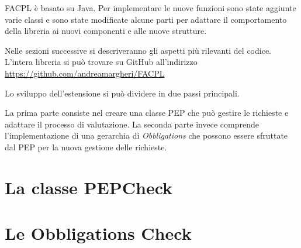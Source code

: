 \label{chap:Estensione della libreria FACPL}
FACPL è basato su Java. Per implementare le nuove funzioni sono state aggiunte varie classi e sono state modificate
alcune parti per adattare il comportamento della libreria ai nuovi componenti e alle nuove strutture.\par
Nelle sezioni successive si descriveranno gli aspetti più rilevanti del codice. L'intera libreria si può trovare su
GitHub all'indirizzo
\center \url{https://github.com/andreamargheri/FACPL}
\\\par
Lo sviluppo dell'estensione si può dividere in due passi principali.\par
La prima parte consiste nel creare una classe PEP che può gestire le richieste e adattare il processo di valutazione.
La seconda parte invece comprende l'implementazione di una gerarchia di \emph{Obbligations} che possono essere
sfruttate dal PEP per la nuova gestione delle richieste.
\section{La classe PEPCheck}
\label{sec:PEPCheck}

\section{Le Obbligations Check}
\label{sec:Le Obbligations Check}
